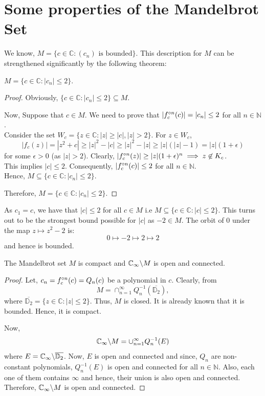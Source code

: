 \section{Some properties of the Mandelbrot Set}
We know, \( M=\{c\in \mathbb{C}:(c_n)\text{ is bounded}\} \). 
This description for \( M \) can be strengthened significantly by the following theorem:
\begin{theorem}\label{thm4.1}
	\( M=\{c\in \mathbb{C}:|c_n|\le 2 \}.\)
\end{theorem}
\begin{proof}Obviously, \( \{c\in \mathbb{C}:|c_n|\le 2\}  \subseteq M\).

	Now, Suppose that \( c\in M \). We need to prove that \( |\fcof[n](c)|=|c_n|\le 2 \) for all \( n\in \mathbb{N} \).\\
	Consider the set \( W_c=\{z\in \mathbb{C}:|z|\ge |c|,|z|>2\} \). For \( z\in W_c \),\[
		|f_c(z)|=|z^2+c|\ge |z|^2-|c|\ge |z|^2-|z|\ge |z|(|z|-1)=|z|(1+\epsilon)
	\] for some \( \epsilon>0 \) (as \( |z|>2 \)). Clearly, \( |\fcof[n](z)|\ge |z|(1+\epsilon)^n \implies z\not\in K_c\).\\
	This implies \( |c|\le 2 \). Consequently, \( |\fcof[n](c)|\le 2 \) for all \( n\in \mathbb{N} \).\\
	Hence, \( M\subseteq  \{c\in \mathbb{C}:|c_n|\le 2 \} \).

	Therefore, \( M=\{c\in \mathbb{C}:|c_n|\le 2\} \).
\end{proof}

As \( c_1=c \), we have that \( |c|\le 2 \) for all \( c\in M \) i.e \( M \subseteq \{c\in \mathbb{C}:|c|\le 2\} \). 
This turns out to be the strongest bound possible for \( |c| \)
as \( -2\in M \). The orbit of \( 0 \) under the map \( z\mapsto z^2-2 \) is: \[ 0\mapsto -2\mapsto 2\mapsto 2 \]
and hence is bounded.

\begin{theorem}
	The Mandelbrot set \( M \) is compact and \( \mathbb{C}_\infty\backslash M \) is open and connected.
\end{theorem}
\begin{proof}
	Let, \( c_n=\fcof[n](c)=Q_n(c) \) be a polynomial in \( c \). Clearly, from  \[
		M=\cap_{n=1}^{\infty}Q_n^{-1}(\overline{\mathbb{D}_2}),
	\] where \( \overline{\mathbb{D}_2}=\{z\in \mathbb{C}:|z|\le 2\} \).
	Thus, \( M \) is closed. It is already known that it is bounded. Hence, it is compact.

	Now, \[
		\mathbb{C}_\infty\backslash M=\cup_{n=1}^\infty Q_n^{-1}(E)
	\] where \( E=\mathbb{C}_\infty\backslash\overline{\mathbb{D}_2}\). Now, \( E \) is open and connected and 
	since, \( Q_n \) are non-constant polynomials, \( Q_n^{-1}(E) \) is open and connected for all \( n\in \mathbb{N} \).
	Also, each one of them contains \( \infty \) and hence, their union is also open and connected.\\
	Therefore, \( \mathbb{C}_\infty\backslash M \) is open and connected.

\end{proof}

